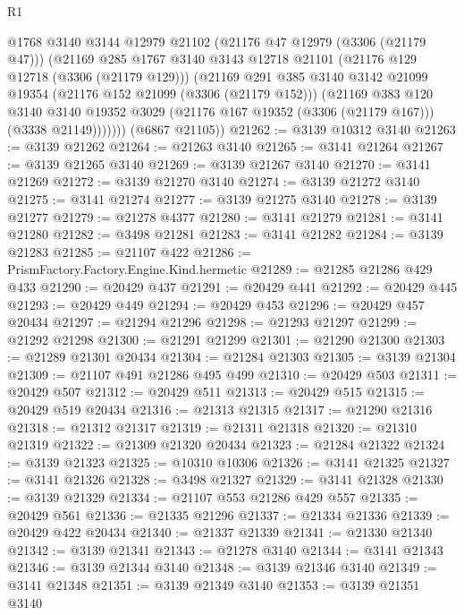\begin{lexlean}{R1}
\begin{coremodule}
            @1768
            @3140
            @3144
            @12979
            @21102
            (@21176 @47 @12979 (@3306 (@21179 @47)))
            (@21169
              @285
              @1767
              @3140
              @3143
              @12718
              @21101
              (@21176 @129 @12718 (@3306 (@21179 @129)))
              (@21169
                @291
                @385
                @3140
                @3142
                @21099
                @19354
                (@21176 @152 @21099 (@3306 (@21179 @152)))
                (@21169
                  @383
                  @120
                  @3140
                  @3140
                  @19352
                  @3029
                  (@21176 @167 @19352 (@3306 (@21179 @167)))
                  (@3338 @21149)))))))
      (@6867 @21105))
@21262 := @3139 @10312 @3140
@21263 := @3139 @21262
@21264 := @21263 @3140
@21265 := @3141 @21264
@21267 := @3139 @21265 @3140
@21269 := @3139 @21267 @3140
@21270 := @3141 @21269
@21272 := @3139 @21270 @3140
@21274 := @3139 @21272 @3140
@21275 := @3141 @21274
@21277 := @3139 @21275 @3140
@21278 := @3139 @21277
@21279 := @21278 @4377
@21280 := @3141 @21279
@21281 := @3141 @21280
@21282 := @3498 @21281
@21283 := @3141 @21282
@21284 := @3139 @21283
@21285 := @21107 @422
@21286 := PrismFactory.Factory.Engine.Kind.hermetic
@21289 := @21285 @21286 @429 @433
@21290 := @20429 @437
@21291 := @20429 @441
@21292 := @20429 @445
@21293 := @20429 @449
@21294 := @20429 @453
@21296 := @20429 @457 @20434
@21297 := @21294 @21296
@21298 := @21293 @21297
@21299 := @21292 @21298
@21300 := @21291 @21299
@21301 := @21290 @21300
@21303 := @21289 @21301 @20434
@21304 := @21284 @21303
@21305 := @3139 @21304
@21309 := @21107 @491 @21286 @495 @499
@21310 := @20429 @503
@21311 := @20429 @507
@21312 := @20429 @511
@21313 := @20429 @515
@21315 := @20429 @519 @20434
@21316 := @21313 @21315
@21317 := @21290 @21316
@21318 := @21312 @21317
@21319 := @21311 @21318
@21320 := @21310 @21319
@21322 := @21309 @21320 @20434
@21323 := @21284 @21322
@21324 := @3139 @21323
@21325 := @10310 @10306
@21326 := @3141 @21325
@21327 := @3141 @21326
@21328 := @3498 @21327
@21329 := @3141 @21328
@21330 := @3139 @21329
@21334 := @21107 @553 @21286 @429 @557
@21335 := @20429 @561
@21336 := @21335 @21296
@21337 := @21334 @21336
@21339 := @20429 @422 @20434
@21340 := @21337 @21339
@21341 := @21330 @21340
@21342 := @3139 @21341
@21343 := @21278 @3140
@21344 := @3141 @21343
@21346 := @3139 @21344 @3140
@21348 := @3139 @21346 @3140
@21349 := @3141 @21348
@21351 := @3139 @21349 @3140
@21353 := @3139 @21351 @3140

\end{coremodule}
\end{lexlean}
